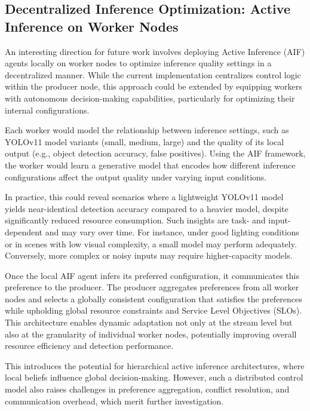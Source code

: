 \subsection{Decentralized Inference Optimization: Active Inference on Worker Nodes}

An interesting direction for future work involves deploying Active Inference (AIF) agents locally on worker nodes to optimize inference quality settings in a decentralized manner. While the current implementation centralizes control logic within the producer node, this approach could be extended by equipping workers with autonomous decision-making capabilities, particularly for optimizing their internal configurations.

Each worker would model the relationship between inference settings, such as YOLOv11 model variants (small, medium, large) and the quality of its local output (e.g., object detection accuracy, false positives). Using the AIF framework, the worker would learn a generative model that encodes how different inference configurations affect the output quality under varying input conditions.

In practice, this could reveal scenarios where a lightweight YOLOv11 model yields near-identical detection accuracy compared to a heavier model, despite significantly reduced resource consumption. Such insights are task- and input-dependent and may vary over time. For instance, under good lighting conditions or in scenes with low visual complexity, a small model may perform adequately. Conversely, more complex or noisy inputs may require higher-capacity models.

Once the local AIF agent infers its preferred configuration, it communicates this preference to the producer. The producer aggregates preferences from all worker nodes and selects a globally consistent configuration that satisfies the preferences while upholding global resource constraints and Service Level Objectives (SLOs). This architecture enables dynamic adaptation not only at the stream level but also at the granularity of individual worker nodes, potentially improving overall resource efficiency and detection performance.

This introduces the potential for hierarchical active inference architectures, where local beliefs influence global decision-making. However, such a distributed control model also raises challenges in preference aggregation, conflict resolution, and communication overhead, which merit further investigation.

